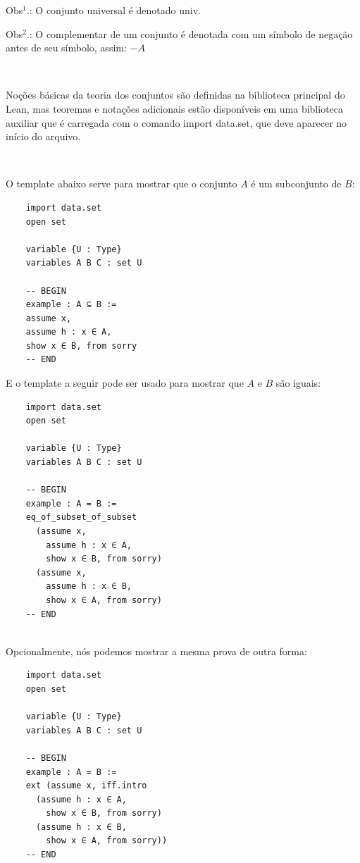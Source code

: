 Obs$^{1}$.: O conjunto universal é denotado {
\selectfont univ}.

Obs$^{2}$.: O complementar de um conjunto é denotada com um símbolo de negação antes de seu símbolo, assim: $-A$

$\qquad$

Noções básicas da teoria dos conjuntos são definidas na biblioteca principal do Lean, mas teoremas e notações adicionais estão disponíveis em uma biblioteca auxiliar que é carregada com o comando 
{
\selectfont import data.set}, que deve aparecer no início do arquivo.

$\qquad$

O template abaixo serve para mostrar que o conjunto $A$ é um subconjunto de $B$:

\begin{lstlisting}
    import data.set
    open set

    variable {U : Type}
    variables A B C : set U

    -- BEGIN
    example : A ⊆ B :=
    assume x,
    assume h : x ∈ A,
    show x ∈ B, from sorry
    -- END

\end{lstlisting}

E o template a seguir pode ser usado para mostrar que $A$ e $B$ são iguais:

\begin{lstlisting}
    import data.set
    open set

    variable {U : Type}
    variables A B C : set U

    -- BEGIN
    example : A = B :=
    eq_of_subset_of_subset
      (assume x,
        assume h : x ∈ A,
        show x ∈ B, from sorry)
      (assume x,
        assume h : x ∈ B,
        show x ∈ A, from sorry)
    -- END
    
\end{lstlisting}

Opcionalmente, nós podemos mostrar a mesma prova de outra forma:

\begin{lstlisting}
    import data.set
    open set

    variable {U : Type}
    variables A B C : set U

    -- BEGIN
    example : A = B :=
    ext (assume x, iff.intro
      (assume h : x ∈ A,
        show x ∈ B, from sorry)
      (assume h : x ∈ B,
        show x ∈ A, from sorry))
    -- END
    
\end{lstlisting}

